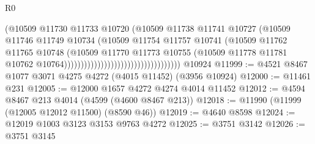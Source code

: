 \begin{lexlean}{R0}
\begin{coremodule}
                                                            (@10509
                                                              @11730
                                                              @11733
                                                              @10720
                                                              (@10509
                                                                @11738
                                                                @11741
                                                                @10727
                                                                (@10509
                                                                  @11746
                                                                  @11749
                                                                  @10734
                                                                  (@10509
                                                                    @11754
                                                                    @11757
                                                                    @10741
                                                                    (@10509
                                                                      @11762
                                                                      @11765
                                                                      @10748
                                                                      (@10509
                                                                        @11770
                                                                        @11773
                                                                        @10755
                                                                        (@10509
                                                                          @11778
                                                                          @11781
                                                                          @10762
                                                                          @10764)))))))))))))))))))))))))))))))))))
    @10924
@11999 := @4521 @8467 @1077 @3071 @4275 @4272 (@4015 @11452) (@3956 @10924)
@12000 := @11461 @231
@12005 := @12000 @1657 @4272 @4274 @4014 @11452
@12012 := @4594 @8467 @213 @4014 (@4599 (@4600 @8467 @213))
@12018 := @11990 (@11999 (@12005 @12012 @11500) (@8590 @46))
@12019 := @4640 @8598
@12024 := @12019 @1003 @3123 @3153 @9763 @4272
@12025 := @3751 @3142
@12026 := @3751 @3145

\end{coremodule}
\end{lexlean}

